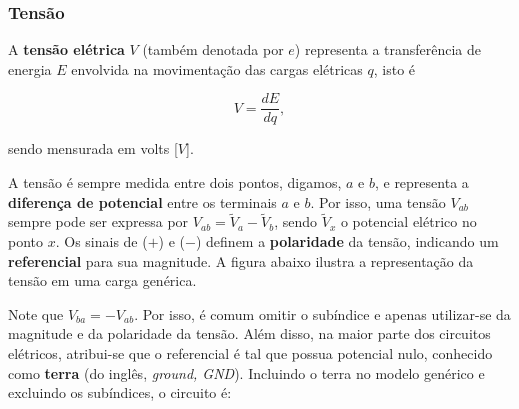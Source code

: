 \documentclass{article}
\numberwithin{equation}{section}
\begin{document}
\subsubsection{Tensão}
\label{subsubsec:tensão}

A \textbf{tensão elétrica} $V$ (também denotada por $e$) representa a transferência de energia $E$ envolvida na movimentação das cargas elétricas $q$, isto é

\begin{equation}
    V = \dfrac{dE}{dq},
\end{equation}

\noindent sendo mensurada em volts [$V$].

A tensão é sempre medida entre dois pontos, digamos, $a$ e $b$, e representa a \textbf{diferença de potencial} entre os terminais $a$ e $b$. Por isso, uma tensão $V_{ab}$ sempre pode ser expressa por $V_{ab}=\tilde{V}_a - \tilde{V}_b$, sendo $\tilde{V}_x$ o potencial elétrico no ponto $x$. Os sinais de ($+$) e ($-$) definem a \textbf{polaridade} da tensão, indicando um \textbf{referencial} para sua magnitude. A figura abaixo ilustra a representação da tensão em uma carga genérica.

\begin{center}
\end{center}

\noindent Note que $V_{ba} = -V_{ab}$. Por isso, é comum omitir o subíndice e apenas utilizar-se da magnitude e da polaridade da tensão. Além disso, na maior parte dos circuitos elétricos, atribui-se que o referencial é tal que possua potencial nulo, conhecido como \textbf{terra} (do inglês, \textit{ground, GND}). Incluindo o terra no modelo genérico e excluindo os subíndices, o circuito é:

\vspace{2mm}

\begin{center}
\end{center}
\end{document}
